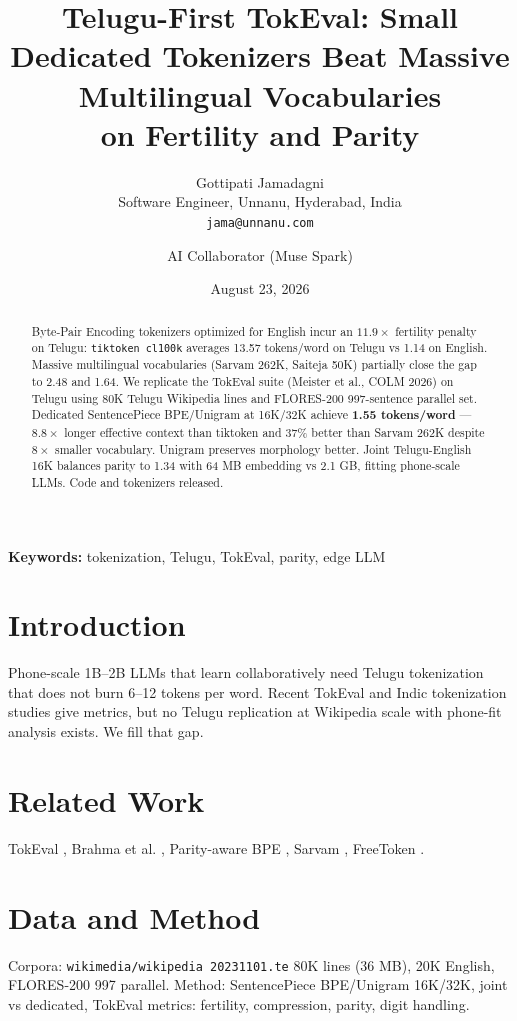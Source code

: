 \documentclass[11pt,a4paper]{article}
\title{Telugu-First TokEval: Small Dedicated Tokenizers Beat Massive Multilingual Vocabularies\\ on Fertility and Parity}
\author{Gottipati Jamadagni\\ Software Engineer, Unnanu, Hyderabad, India\\ \texttt{jama@unnanu.com} \and AI Collaborator (Muse Spark)}
\date{August 23, 2026}
\begin{document}
\maketitle
\begin{abstract}
Byte-Pair Encoding tokenizers optimized for English incur an $11.9\times$ fertility penalty on Telugu: \texttt{tiktoken cl100k} averages 13.57 tokens/word on Telugu vs 1.14 on English. Massive multilingual vocabularies (Sarvam 262K, Saiteja 50K) partially close the gap to 2.48 and 1.64. We replicate the TokEval suite (Meister et al., COLM 2026) on Telugu using 80K Telugu Wikipedia lines and FLORES-200 997-sentence parallel set. Dedicated SentencePiece BPE/Unigram at 16K/32K achieve \textbf{1.55 tokens/word} --- $8.8\times$ longer effective context than tiktoken and 37\% better than Sarvam 262K despite $8\times$ smaller vocabulary. Unigram preserves morphology better. Joint Telugu-English 16K balances parity to 1.34 with 64 MB embedding vs 2.1 GB, fitting phone-scale LLMs. Code and tokenizers released.
\end{abstract}
\noindent\textbf{Keywords:} tokenization, Telugu, TokEval, parity, edge LLM

\section{Introduction}
Phone-scale 1B--2B LLMs that learn collaboratively need Telugu tokenization that does not burn 6--12 tokens per word. Recent TokEval \cite{tokeval} and Indic tokenization studies \cite{brahma2026} give metrics, but no Telugu replication at Wikipedia scale with phone-fit analysis exists. We fill that gap.

\section{Related Work}
TokEval \cite{tokeval}, Brahma et al. \cite{brahma2026}, Parity-aware BPE \cite{foroutan2026,kanjirangat2026}, Sarvam \cite{sarvam}, FreeToken \cite{freetoken}.

\section{Data and Method}
Corpora: \texttt{wikimedia/wikipedia 20231101.te} 80K lines (36 MB), 20K English, FLORES-200 997 parallel. Method: SentencePiece BPE/Unigram 16K/32K, joint vs dedicated, TokEval metrics: fertility, compression, parity, digit handling.
\end{document}
